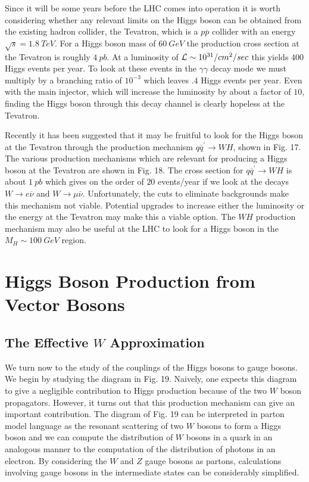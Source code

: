 Since it will be some years before the LHC comes into operation
it is worth considering whether any relevant limits on the Higgs
boson can be obtained from the existing hadron collider, the
Tevatron, which is a $p \overline{p}$ collider with an energy
$\sqrt{s}=1.8~TeV$.  For a Higgs boson mass of $60~GeV$  the production
 cross
section at the Tevatron is roughly $4~pb$.  At a luminosity
of ${\cal L}\sim 10^{31}/cm^2/sec$ this yields $400$ Higgs events
per year.  To look at these events in the $\gamma\gamma$ decay
mode we must multiply by a branching ratio of $10^{-3}$ which
leaves $.4$ Higgs events per year.  Even with the main injector,
which will increase the luminosity by about a factor of $10$,
finding the Higgs boson through this decay channel is clearly
hopeless at the Tevatron.

Recently it has been suggested that it may be fruitful to look for
the Higgs boson at the Tevatron through the production mechanism
$q \overline{q}^{\prime}\rightarrow W H$,
 shown in Fig. 17.\cite{stange,gunhan}
  The various production
mechanisms which are relevant for producing a Higgs boson at the
Tevatron are shown in Fig. 18.
The cross section for
 $q \overline{q}^{\prime}
\rightarrow W H$  is about $1~pb$ which gives on the
order of $20$ events/year if we look at the decays $W\rightarrow
e{\overline \nu}$ and $W\rightarrow \mu{\overline \nu}$.
  Unfortunately, the cuts to eliminate
backgrounds make this mechanism not viable.
Potential upgrades to increase either the luminosity or the energy
at the Tevatron may make this a viable option.\cite{stange,gunhan}
The $WH$ production mechanism may also be useful at the LHC to look
for a Higgs boson in the $M_H\sim 100~GeV$ region.

\section{Higgs Boson Production from Vector Bosons}
\subsection{The Effective $W$ Approximation}

We turn now to the  study  of
the couplings of the Higgs bosons to gauge
bosons.  We begin by studying the diagram in Fig. 19.
Naively, one expects this diagram to give a negligible contribution
to Higgs production because of the two $W$ boson propagators.  However,
it  turns out that this production mechanism
can give an important contribution.
The diagram of Fig. 19 can be interpreted in parton model language
as the resonant scattering of two $W$ bosons to form a Higgs
boson\cite{effw} and we
can compute the distribution of $W$ bosons in a quark in an
analogous manner to the computation of the distribution of photons
in an electron.\cite{effgam}
By considering the $W$ and $Z$ gauge bosons as partons, calculations
involving gauge bosons in the intermediate states can be considerably
simplified.


